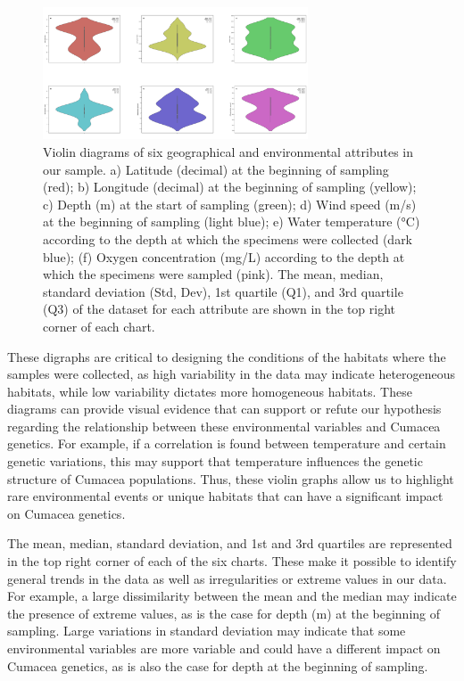 \begin{figure}[]
    \centering
    \includegraphics[width=0.7\textwidth]{figure1.jpg}
    \caption{Violin diagrams of six geographical and environmental attributes in our sample. a) Latitude (decimal) at the beginning of sampling (red); b) Longitude (decimal) at the beginning of sampling (yellow); c) Depth (m) at the start of sampling (green); d) Wind speed (m/s) at the beginning of sampling (light blue); e) Water temperature (°C) according to the depth at which the specimens were collected (dark blue); (f) Oxygen concentration (mg/L) according to the depth at which the specimens were sampled (pink). The mean, median, standard deviation (Std, Dev), 1st quartile (Q1), and 3rd quartile (Q3) of the dataset for each attribute are shown in the top right corner of each chart. \label{fig:fig1}}
\end{figure}

These digraphs are critical to designing the conditions of the habitats where the samples were collected, as high variability in the data may indicate heterogeneous habitats, while low variability dictates more homogeneous habitats. These diagrams can provide visual evidence that can support or refute our hypothesis regarding the relationship between these environmental variables and Cumacea genetics. For example, if a correlation is found between temperature and certain genetic variations, this may support that temperature influences the genetic structure of Cumacea populations. Thus, these violin graphs allow us to highlight rare environmental events or unique habitats that can have a significant impact on Cumacea genetics. 

The mean, median, standard deviation, and 1st and 3rd quartiles are represented in the top right corner of each of the six charts. These make it possible to identify general trends in the data as well as irregularities or extreme values in our data. For example, a large dissimilarity between the mean and the median may indicate the presence of extreme values, as is the case for depth (m) at the beginning of sampling. Large variations in standard deviation may indicate that some environmental variables are more variable and could have a different impact on Cumacea genetics, as is also the case for depth at the beginning of sampling. 

